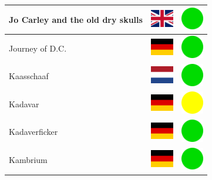 \documentclass[12pt, a4paper, twoside]{report}
\begin{document}
\begin{center}
\begin{longtable}{|p{5cm}|p{2cm}|p{2cm}|}
Jo Carley and the old dry skulls & \includegraphics[width=1cm]{4x3/gb} & \includegraphics[width=1cm]{likes/y} \\ \hline
Journey of D.C. & \includegraphics[width=1cm]{4x3/de} & \includegraphics[width=1cm]{likes/y} \\ \hline
Kaasschaaf & \includegraphics[width=1cm]{4x3/nl} & \includegraphics[width=1cm]{likes/y} \\ \hline
Kadavar & \includegraphics[width=1cm]{4x3/de} & \includegraphics[width=1cm]{likes/m} \\ \hline
Kadaverficker & \includegraphics[width=1cm]{4x3/de} & \includegraphics[width=1cm]{likes/y} \\ \hline
Kambrium & \includegraphics[width=1cm]{4x3/de} & \includegraphics[width=1cm]{likes/y} \\ \hline

\end{longtable}
\end{center}
\end{document}
